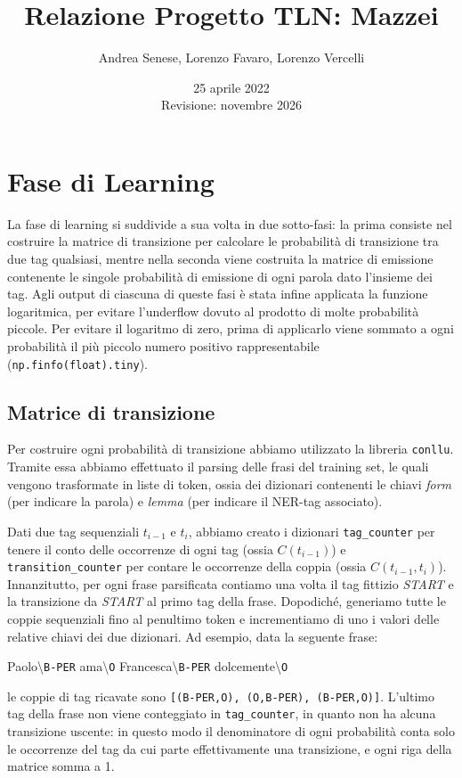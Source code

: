\documentclass[a4paper,11pt,notitlepage]{report}
\title{Relazione Progetto TLN: Mazzei}
\author{Andrea Senese, Lorenzo Favaro, Lorenzo Vercelli}
\date{25 aprile 2022 \\ \small Revisione: novembre 2026}
\begin{document}
\maketitle
\tableofcontents

\chapter{Fase di Learning}
La fase di learning si suddivide a sua volta in due sotto-fasi: la prima consiste nel costruire la matrice di transizione per calcolare le probabilità di transizione tra due tag qualsiasi, mentre nella seconda viene costruita la matrice di emissione contenente le singole probabilità di emissione di ogni parola dato l'insieme dei tag. Agli output di ciascuna di queste fasi è stata infine applicata la funzione logaritmica, per evitare l'underflow dovuto al prodotto di molte probabilità piccole. Per evitare il logaritmo di zero, prima di applicarlo viene sommato a ogni probabilità il più piccolo numero positivo rappresentabile (\texttt{np.finfo(float).tiny}).

\section{Matrice di transizione}
Per costruire ogni probabilità di transizione abbiamo utilizzato la libreria \texttt{conllu}. Tramite essa abbiamo effettuato il parsing delle frasi del training set, le quali vengono trasformate in liste di token, ossia dei dizionari contenenti le chiavi \textit{form} (per indicare la parola) e \textit{lemma} (per indicare il NER-tag associato).

Dati due tag sequenziali $t_{i-1}$ e $t_i$, abbiamo creato i dizionari \texttt{tag\_counter} per tenere il conto delle occorrenze di ogni tag (ossia $C(t_{i-1})$) e \texttt{transition\_counter} per contare le occorrenze della coppia (ossia $C(t_{i-1},t_i)$).
Innanzitutto, per ogni frase parsificata contiamo una volta il tag fittizio \textit{START} e la transizione da \textit{START} al primo tag della frase.
Dopodiché, generiamo tutte le coppie sequenziali fino al penultimo token e incrementiamo di uno i valori delle relative chiavi dei due dizionari. Ad esempio, data la seguente frase:
\begin{center}
    Paolo\textbackslash \texttt{B-PER} ama\textbackslash \texttt{O} Francesca\textbackslash \texttt{B-PER} dolcemente\textbackslash \texttt{O}
\end{center}
le coppie di tag ricavate sono \texttt{[(B-PER,O), (O,B-PER), (B-PER,O)]}.
L'ultimo tag della frase non viene conteggiato in \texttt{tag\_counter}, in quanto non ha alcuna transizione uscente: in questo modo il denominatore di ogni probabilità conta solo le occorrenze del tag da cui parte effettivamente una transizione, e ogni riga della matrice somma a 1.
\end{document}
